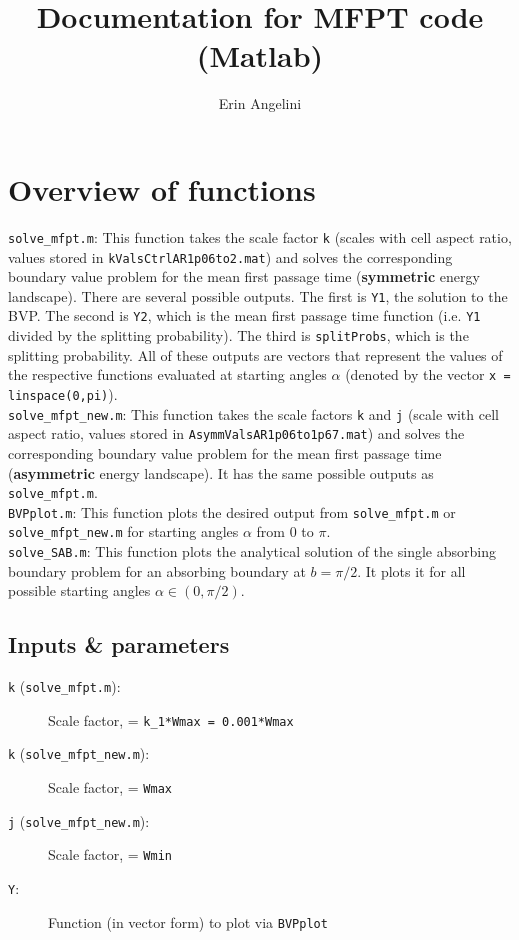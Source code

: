 \documentclass{article}
\author{Erin Angelini}
\title{Documentation for MFPT code (Matlab)}
\begin{document}
\maketitle

\section{Overview of functions}
\noindent\texttt{solve\_mfpt.m}: This function takes the scale factor \texttt{k} (scales with cell aspect ratio, values stored in \texttt{kValsCtrlAR1p06to2.mat}) and solves the corresponding boundary value problem for the mean first passage time (\textbf{symmetric} energy landscape). There are several possible outputs. The first is \texttt{Y1}, the solution to the BVP. The second is \texttt{Y2}, which is the mean first passage time function (i.e. \texttt{Y1} divided by the splitting probability). The third is \texttt{splitProbs}, which is the splitting probability. All of these outputs are vectors that represent the values of the respective functions evaluated at starting angles $\alpha$ (denoted by the vector \texttt{x = linspace(0,pi)}).
\\[3pt]

\noindent\texttt{solve\_mfpt\_new.m}: This function takes the scale factors \texttt{k} and \texttt{j} (scale with cell aspect ratio, values stored in \texttt{AsymmValsAR1p06to1p67.mat}) and solves the corresponding boundary value problem for the mean first passage time (\textbf{asymmetric} energy landscape). It has the same possible outputs as \texttt{solve\_mfpt.m}.
\\[3pt]

\noindent\texttt{BVPplot.m}: This function plots the desired output from \texttt{solve\_mfpt.m} or  \texttt{solve\_mfpt\_new.m} for starting angles $\alpha$ from 0 to $\pi$.
\\[3pt]

\noindent\texttt{solve\_SAB.m}: This function plots the analytical solution of the single absorbing boundary problem for an absorbing boundary at $b = \pi/2$. It plots it for all possible starting angles $\alpha \in (0,\pi/2).$
\\[3pt]

\subsection{Inputs \& parameters}

\begin{description}
\item[\texttt{k} (\texttt{solve\_mfpt.m}):] Scale factor, = \texttt{k\_1*Wmax = 0.001*Wmax}
\item[\texttt{k} (\texttt{solve\_mfpt\_new.m}):] Scale factor, = \texttt{Wmax}
\item[\texttt{j} (\texttt{solve\_mfpt\_new.m}):] Scale factor, = \texttt{Wmin}
\item[\texttt{Y}:] Function (in vector form) to plot via \texttt{BVPplot}
\end{description}
\end{document}
